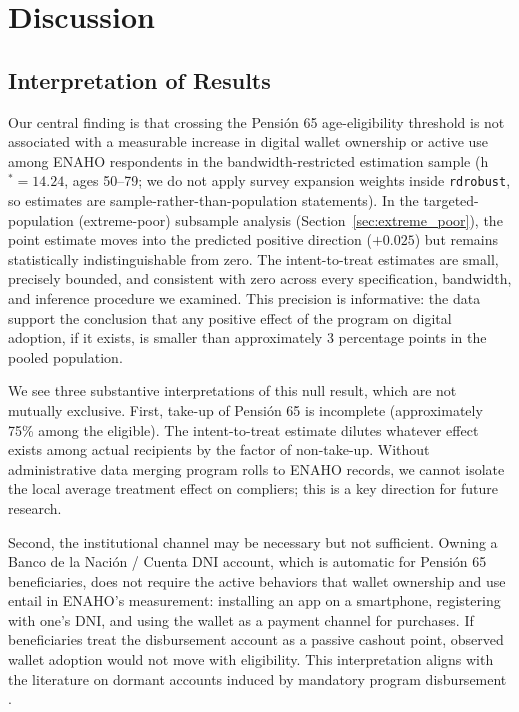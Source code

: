\documentclass[12pt]{article}
\begin{document}
\section{Discussion}
\label{sec:discussion}

\subsection{Interpretation of Results}

Our central finding is that crossing the Pensi\'on 65 age-eligibility threshold is not associated with a measurable increase in digital wallet ownership or active use among ENAHO respondents in the bandwidth-restricted estimation sample (h$^{\ast}\!=\!14.24$, ages 50--79; we do not apply survey expansion weights inside \texttt{rdrobust}, so estimates are sample-rather-than-population statements). In the targeted-population (extreme-poor) subsample analysis (Section~\ref{sec:extreme_poor}), the point estimate moves into the predicted positive direction ($+0.025$) but remains statistically indistinguishable from zero. The intent-to-treat estimates are small, precisely bounded, and consistent with zero across every specification, bandwidth, and inference procedure we examined. This precision is informative: the data support the conclusion that any positive effect of the program on digital adoption, if it exists, is smaller than approximately 3 percentage points in the pooled population.

We see three substantive interpretations of this null result, which are not mutually exclusive. First, take-up of Pensi\'on 65 is incomplete (approximately 75\% among the eligible). The intent-to-treat estimate dilutes whatever effect exists among actual recipients by the factor of non-take-up. Without administrative data merging program rolls to ENAHO records, we cannot isolate the local average treatment effect on compliers; this is a key direction for future research.

Second, the institutional channel may be necessary but not sufficient. Owning a Banco de la Naci\'on / Cuenta DNI account, which is automatic for Pensi\'on 65 beneficiaries, does not require the active behaviors that wallet ownership and use entail in ENAHO's measurement: installing an app on a smartphone, registering with one's DNI, and using the wallet as a payment channel for purchases. If beneficiaries treat the disbursement account as a passive cashout point, observed wallet adoption would not move with eligibility. This interpretation aligns with the literature on dormant accounts induced by mandatory program disbursement \citep{bachas2018,banerjee2020}.
\end{document}
